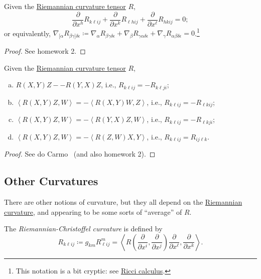 \begin{proposition}\label{prop:2nd-Bianchi-identity}
	Given the \hyperref[def:Riemannian-curvature]{Riemannian curvature tensor} \(R\),
	\[
		\frac{\partial }{\partial x^h} R_{k \ell i j} + \frac{\partial }{\partial x^k} R_{\ell h i j} + \frac{\partial }{\partial x^{\ell } } R_{h k i j} = 0;
	\]
	or equivalently, \(\nabla _{[\alpha} R_{\beta \gamma ]\delta \epsilon }\coloneqq \nabla _\alpha R_{\beta \gamma \delta \epsilon }+ \nabla _\beta R_{\gamma \alpha \delta \epsilon }+ \nabla _\gamma R_{\alpha \beta \delta \epsilon }= 0\).\footnote{This notation is a bit cryptic: see \href{https://en.wikipedia.org/wiki/Ricci_calculus}{Ricci calculus}.}
\end{proposition}
\begin{proof}
	See homework 2.
\end{proof}

\begin{proposition}
	Given the \hyperref[def:Riemannian-curvature]{Riemannian curvature tensor} \(R\),
	\begin{enumerate}[(a)]
		\item \(R(X, Y)Z - -R(Y, X)Z\), i.e., \(R_{k \ell i j} = -R_{k \ell j i}\);
		\item \(\left\langle R(X, Y)Z, W \right\rangle = -\left\langle R(X, Y)W, Z \right\rangle\), i.e., \(R_{k \ell i j} = -R_{\ell k i j}\);
		\item \(\left\langle R(X, Y)Z, W \right\rangle = -\left\langle R(Y, X)Z, W \right\rangle\), i.e., \(R_{k \ell i j} = -R_{\ell k j i}\);
		\item \(\left\langle R(X, Y)Z, W \right\rangle = -\left\langle R(Z, W)X, Y \right\rangle\), i.e., \(R_{k \ell i j} = R_{i j \ell k}\).
	\end{enumerate}
\end{proposition}
\begin{proof}
	See do Carmo~\cite[Proposition 2.5]{flaherty2013riemannian} (and also homework 2).
\end{proof}

\subsection{Other Curvatures}
There are other notions of curvature, but they all depend on the \hyperref[def:Riemannian-curvature]{Riemannian curvature}, and appearing to be some sorts of ``average'' of \(R\).

\begin{definition}\label{def:Riemannian-Christoffel-curvature}
	The \emph{Riemannian-Christoffel curvature}	is defined by
	\[
		R_{k \ell ij}
		\coloneqq g_{km} R^m_{\ell ij}
		= \left\langle R\left( \frac{\partial }{\partial x^i}, \frac{\partial }{\partial x^j} \right) \frac{\partial }{\partial x^{\ell } }, \frac{\partial }{\partial x^k} \right\rangle.
	\]
\end{definition}

